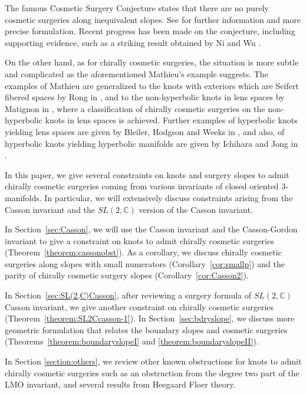 \documentclass{amsart}
\theoremstyle{remark}
\theoremstyle{definition}
\begin{document}
The famous Cosmetic Surgery Conjecture states that there are no purely cosmetic surgeries along inequivalent slopes. 
See \cite[Problem 1.81(A)]{Kirby} for further information and more precise formulation.
Recent progress has been made on the conjecture, including supporting evidence, such as a striking result obtained by Ni and Wu \cite{NiWu}.


On the other hand, as for chirally cosmetic surgeries, the situation is more subtle and complicated as the aforementioned Mathieu's example suggests. 
The examples of Mathieu are generalized to the knots with exteriors which are Seifert fibered spaces by Rong in \cite{Rong}, 
and to the non-hyperbolic knots in lens spaces by Matignon in \cite{Matignon}, 
where a classification of chirally cosmetic surgeries on the non-hyperbolic knots in lens spaces is achieved. 
Further examples of hyperbolic knots yielding lens spaces are given by Bleiler, Hodgson and Weeks in \cite{BleilerHodgsonWeeks}, 
and also, of hyperbolic knots yielding hyperbolic manifolds are given by Ichihara and Jong in \cite{IchiharaJong}. 


In this paper, we give several constraints on knots and surgery slopes to admit chirally cosmetic surgeries coming from various invariants of closed oriented 3-manifolds. 
In particular, we will extensively discuss constraints arising from the Casson invariant and the $SL(2,\mathbb{C})$ version of the Casson invariant. 



In Section~\ref{sec:Casson}, we will use the Casson invariant and the Casson-Gordon invariant to give a constraint on knots to admit chirally cosmetic surgeries 
(Theorem~\ref{theorem:cassonobst}). 
As a corollary, we discuss chirally cosmetic surgeries along slopes with small numerators (Corollary~\ref{cor:smallp}) and the parity of chirally cosmetic surgery slopes 
(Corollary~\ref{cor:Casson2}). 


In Section~\ref{sec:SL(2,C)Casson}, after reviewing a surgery formula of $SL(2,\mathbb{C})$ Casson invariant, 
we give another constraint on  chirally cosmetic surgeries (Theorem~\ref{theorem:SL2Ccasson-1}). 
In Section~\ref{sec:bdryslope}, we discuss more geometric formulation that relates the boundary slopes and cosmetic surgeries 
(Theorems~\ref{theorem:boundaryslopeI} and \ref{theorem:boundaryslopeII}). 

In Section \ref{section:others}, we review other known obstructions for knots to admit chirally cosmetic surgeries 
such as an obstruction from the degree two part of the LMO invariant, and several results from Heegaard Floer theory.
\end{document}
